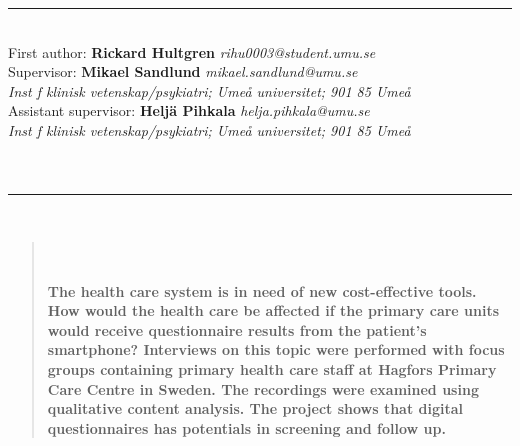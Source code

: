 \documentclass[12pt,a4paper,oneside]{article}
\begin{document}
\hrule
\ \\
{\small First author:} {\small \bf Rickard Hultgren} {\small \it rihu0003@student.umu.se}\vspace{.25cm}\\
 {\small Supervisor:} {\small \bf Mikael Sandlund} {\small \it mikael.sandlund@umu.se}\\
 {\small\it Inst f klinisk vetenskap/psykiatri; Ume\r{a} universitet; 901 85 Ume\r{a}}\vspace{.25cm}\\
 {\small Assistant supervisor:} {\small \bf Helj{\"a} Pihkala} {\small \it helja.pihkala@umu.se}\\
 {\small\it Inst f klinisk vetenskap/psykiatri; Ume\r{a} universitet; 901 85 Ume\r{a}}\vspace{.5cm}\\
{\\}\\
\hrule
\ \\
\selectfont

\begin{abstract}
\ \\\vspace{-2em}\ \\
\bfseries{
The health care system is in need of new cost-effective tools. How would the health care be affected if the primary care units would receive questionnaire results from the patient's smartphone? Interviews on this topic were performed with focus groups containing primary health care staff at Hagfors Primary Care Centre in Sweden. The recordings were examined using qualitative content analysis. The project shows that digital questionnaires has potentials in screening and follow up.
}
\end{abstract}
\end{document}
